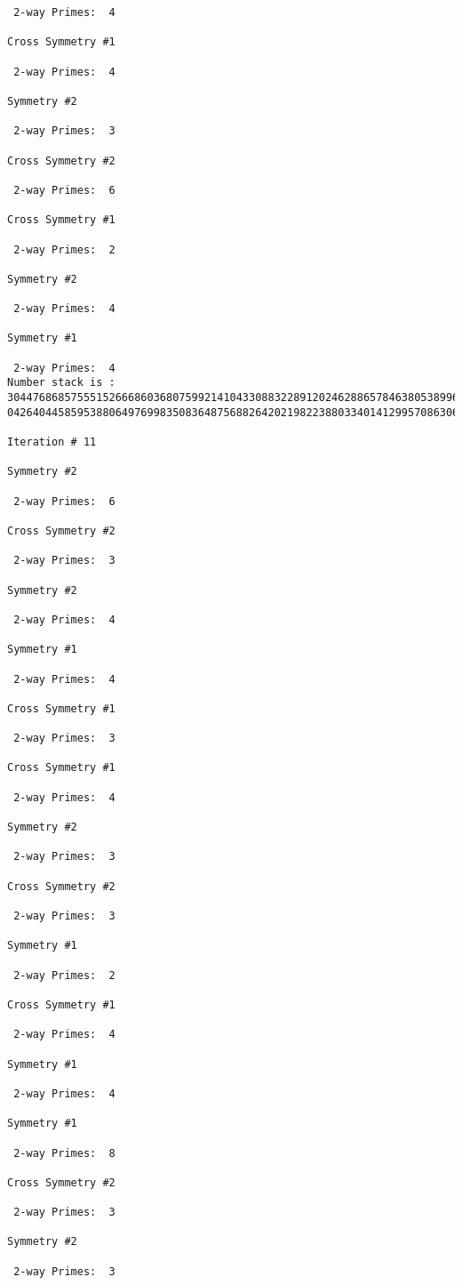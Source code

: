 {{{{\begin{verbatim}
 2-way Primes: 	4

Cross Symmetry #1

 2-way Primes: 	4

Symmetry #2

 2-way Primes: 	3

Cross Symmetry #2

 2-way Primes: 	6

Cross Symmetry #1

 2-way Primes: 	2

Symmetry #2

 2-way Primes: 	4

Symmetry #1

 2-way Primes: 	4
Number stack is :
30447686857555152666860368075992141043308832289120246288657846380538996794608835958544046240163340857
04264044585953880649769983508364875688264202198223880334014129957086306866625155575868674403758043361

Iteration #	11

Symmetry #2

 2-way Primes: 	6

Cross Symmetry #2

 2-way Primes: 	3

Symmetry #2

 2-way Primes: 	4

Symmetry #1

 2-way Primes: 	4

Cross Symmetry #1

 2-way Primes: 	3

Cross Symmetry #1

 2-way Primes: 	4

Symmetry #2

 2-way Primes: 	3

Cross Symmetry #2

 2-way Primes: 	3

Symmetry #1

 2-way Primes: 	2

Cross Symmetry #1

 2-way Primes: 	4

Symmetry #1

 2-way Primes: 	4

Symmetry #1

 2-way Primes: 	8

Cross Symmetry #2

 2-way Primes: 	3

Symmetry #2

 2-way Primes: 	3


\end{verbatim}}}}}
